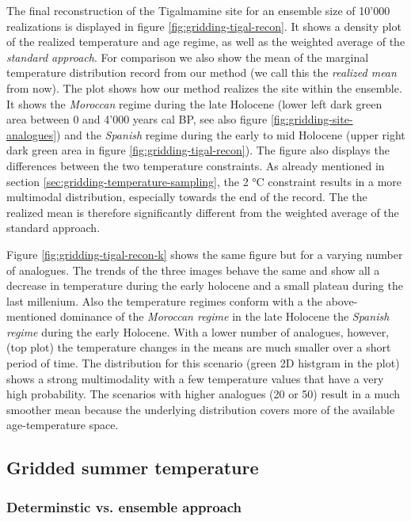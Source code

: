 \begin{refsection}
The final reconstruction of the Tigalmamine site for an ensemble size of 10'000 realizations is displayed in figure \ref{fig:gridding-tigal-recon}. It shows a density plot of the realized temperature and age regime, as well as the weighted average of the \textit{standard approach}. For comparison we also show the mean of the marginal temperature distribution record from our method (we call this the \textit{realized mean} from now). The plot shows how our method realizes the site within the ensemble. It shows the \textit{Moroccan} regime during the late Holocene (lower left dark green area between 0 and 4'000 years cal BP, see also figure \ref{fig:gridding-site-analogues}) and the \textit{Spanish} regime during the early to mid Holocene (upper right dark green area in figure \ref{fig:gridding-tigal-recon}). The figure also displays the differences between the two temperature constraints. As already mentioned in section \ref{sec:gridding-temperature-sampling}, the 2 °C constraint results in a more multimodal distribution, especially towards the end of the record. The the realized mean is therefore significantly different from the weighted average of the standard approach. 

Figure \ref{fig:gridding-tigal-recon-k} shows the same figure but for a varying number of analogues. The trends of the three images behave the same and show all a decrease in temperature during the early holocene and a small plateau during the last millenium. Also the temperature regimes conform with a the above-mentioned dominance of the \textit{Moroccan regime} in the late Holocene the \textit{Spanish regime} during the early Holocene. With a lower number of analogues, however, (top plot) the temperature changes in the means are much smaller over a short period of time. The distribution for this scenario (green 2D histgram in the plot) shows a strong multimodality with a few temperature values that have a very high probability. The scenarios with higher analogues (20 or 50) result in a much smoother mean because the underlying distribution covers more of the available age-temperature space.

\subsection{Gridded summer temperature} \label{sec:gridding-gridded-results}

\subsubsection{Determinstic vs. ensemble approach}


\end{refsection}

